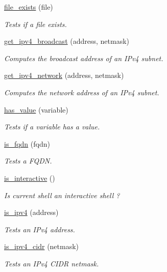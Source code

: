 \begin{DoxyCompactItemize}
\hyperlink{group__file__and__dir_ga7bafedbe019acc08d0987a035fdf7496}{file\+\_\+exists} (file)
\begin{DoxyCompactList}\small\item\em Tests if a file exists. \end{DoxyCompactList}\item 
\hyperlink{group__network_gaa7e1a6c8a8ae517d7ae3b649dbc975c3}{get\+\_\+ipv4\+\_\+broadcast} (address, netmask)
\begin{DoxyCompactList}\small\item\em Computes the broadcast address of an I\+Pv4 subnet. \end{DoxyCompactList}\item 
\hyperlink{group__network_ga245d578ab59cdd517ba14695a186aeb9}{get\+\_\+ipv4\+\_\+network} (address, netmask)
\begin{DoxyCompactList}\small\item\em Computes the network address of an I\+Pv4 subnet. \end{DoxyCompactList}\item 
\hyperlink{group__variable_gadcb24eedf60597a74574f69ef6a8de8e}{has\+\_\+value} (variable)
\begin{DoxyCompactList}\small\item\em Tests if a variable has a value. \end{DoxyCompactList}\item 
\hyperlink{group__network_ga6e20cc89dd0c8bbc15076e5e5bd694d6}{is\+\_\+fqdn} (fqdn)
\begin{DoxyCompactList}\small\item\em Tests a F\+Q\+DN. \end{DoxyCompactList}\item 
\hyperlink{group__misc_ga0c121287140dbce260ccffefd385e3fc}{is\+\_\+interactive} ()
\begin{DoxyCompactList}\small\item\em Is current shell an interactive shell ? \end{DoxyCompactList}\item 
\hyperlink{group__network_ga807cd53aced8db0cdab6c03b1d80efef}{is\+\_\+ipv4} (address)
\begin{DoxyCompactList}\small\item\em Tests an I\+Pv4 address. \end{DoxyCompactList}\item 
\hyperlink{group__network_ga797eb7c1580e19ec5b08ceb5ef7a4ff3}{is\+\_\+ipv4\+\_\+cidr} (netmask)
\begin{DoxyCompactList}\small\item\em Tests an I\+Pv4 C\+I\+DR netmask. \end{DoxyCompactList}\item 

\end{DoxyCompactItemize}
